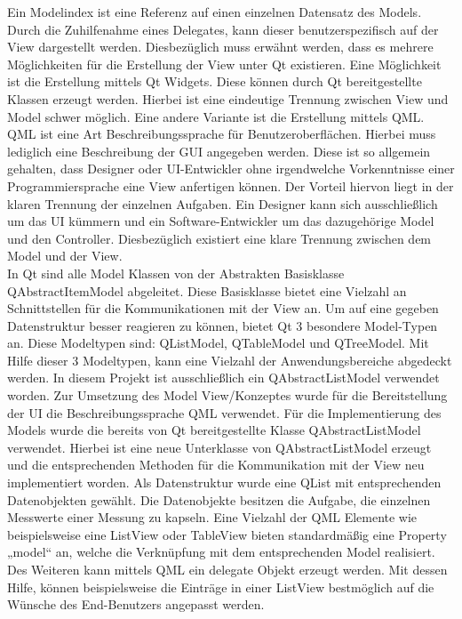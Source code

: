 Ein Modelindex ist eine Referenz auf einen einzelnen Datensatz des Models. Durch die Zuhilfenahme eines Delegates, kann dieser benutzerspezifisch auf der View dargestellt werden. Diesbezüglich muss erwähnt werden, dass es mehrere Möglichkeiten für die Erstellung der View unter Qt existieren. Eine Möglichkeit ist die Erstellung mittels Qt Widgets. Diese können durch Qt bereitgestellte Klassen erzeugt werden. Hierbei ist eine eindeutige Trennung zwischen View und Model schwer möglich. Eine andere Variante ist die Erstellung mittels QML. QML ist eine Art Beschreibungssprache für Benutzeroberflächen. Hierbei muss lediglich eine Beschreibung der GUI angegeben werden. Diese ist so allgemein gehalten, dass Designer oder UI-Entwickler ohne irgendwelche Vorkenntnisse einer Programmiersprache eine View anfertigen können. Der Vorteil hiervon liegt in der klaren Trennung der einzelnen Aufgaben. Ein Designer kann sich ausschließlich um das UI kümmern und ein Software-Entwickler um das dazugehörige Model und den Controller. Diesbezüglich existiert eine klare Trennung zwischen dem Model und der View.\\

In Qt sind alle Model Klassen von der Abstrakten Basisklasse QAbstractItemModel abgeleitet. Diese Basisklasse bietet eine Vielzahl an Schnittstellen für die Kommunikationen mit der View an. Um auf eine gegeben Datenstruktur besser reagieren zu können, bietet Qt 3 besondere Model-Typen an. Diese Modeltypen sind: QListModel, QTableModel und QTreeModel. Mit Hilfe dieser 3 Modeltypen, kann eine Vielzahl der Anwendungsbereiche abgedeckt werden. In diesem Projekt ist ausschließlich ein QAbstractListModel verwendet worden. Zur Umsetzung des Model View/Konzeptes wurde für die Bereitstellung der UI die Beschreibungssprache QML verwendet. Für die Implementierung des Models wurde die bereits von Qt bereitgestellte Klasse QAbstractListModel verwendet. Hierbei ist eine neue Unterklasse von QAbstractListModel erzeugt und die entsprechenden Methoden für die Kommunikation mit der View neu implementiert worden. Als Datenstruktur wurde eine QList mit entsprechenden Datenobjekten gewählt. Die Datenobjekte besitzen die Aufgabe, die einzelnen Messwerte einer Messung zu kapseln. Eine Vielzahl der QML Elemente wie beispielsweise eine ListView oder TableView bieten standardmäßig eine Property „model“ an, welche die Verknüpfung mit dem entsprechenden Model realisiert. Des Weiteren kann mittels QML ein delegate Objekt erzeugt werden. Mit dessen Hilfe, können beispielsweise die Einträge in einer ListView bestmöglich auf die Wünsche des End-Benutzers angepasst werden. \\

